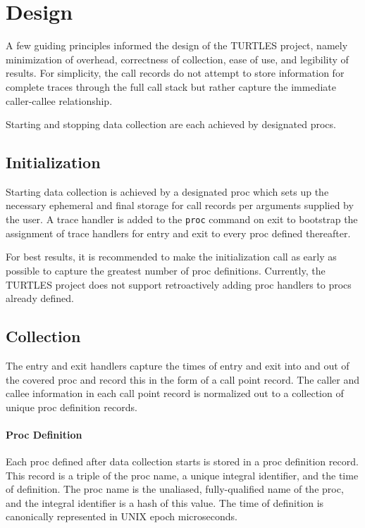\documentclass{article}[letter,10pt]
\begin{document}
\section{Design}{
  A few guiding principles informed the design of the TURTLES project, namely
  minimization of overhead, correctness of collection, ease of use, and legibility
  of results. For simplicity, the call records do not attempt to store information
  for complete traces through the full call stack but rather capture the immediate
  caller-callee relationship.

  Starting and stopping data collection are each achieved by designated procs.

  \subsection{Initialization}{
    Starting data collection is achieved by a designated proc which sets up
    the necessary ephemeral and final storage for call records per arguments
    supplied by the user. A trace handler is added to the \texttt{proc} command on exit
    to bootstrap the assignment of trace handlers for entry and exit to every
    proc defined thereafter.

    For best results, it is recommended to make the initialization call as early
    as possible to capture the greatest number of proc definitions. Currently,
    the TURTLES project does not support retroactively adding proc handlers
    to procs already defined.

  }
  \subsection{Collection}{
    The entry and exit handlers capture the times of entry and exit into and out of
    the covered proc and record this in the form of a call point record. The caller
    and callee information in each call point record is normalized out to a collection
    of unique proc definition records.

    \paragraph{Proc Definition}{
      Each proc defined after data collection starts is stored in a proc definition
      record. This record is a triple of the proc name, a unique integral identifier,
      and the time of definition. The proc name is the unaliased, fully-qualified
      name of the proc, and the integral identifier is a hash of this value.
      The time of definition is canonically represented in UNIX epoch microseconds.
    }
}}
\end{document}
